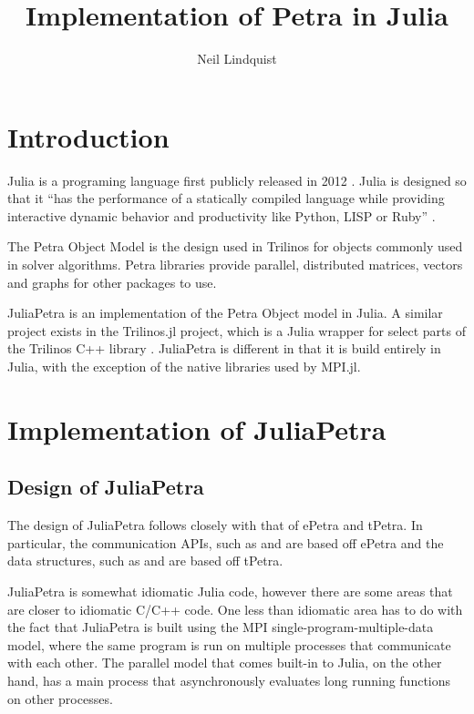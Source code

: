 \documentclass[acmsmall]{acmart}
\title{Implementation of Petra in Julia}
\author{Neil Lindquist}
\newcommand{\juliaSnippet}[1]{\texttt{\detokenize{#1}}}
\begin{document}
\maketitle

\section{Introduction}

Julia is a programing language first publicly released in 2012 \cite{WhyWeCreatedJulia}.
Julia is designed so that it
``has the performance of a statically compiled
language while providing interactive dynamic behavior and productivity like Python, LISP or
Ruby'' \cite{JuliaDesignPaper}.

The Petra Object Model is the design used in Trilinos for objects commonly used in solver algorithms.
\cite{OverviewOfTrilinos}
Petra libraries provide parallel, distributed matrices, vectors and graphs for other packages to use.

JuliaPetra is an implementation of the Petra Object model in Julia.
A similar project exists in the Trilinos.jl project, which is a Julia wrapper for select parts of
the Trilinos C++ library \cite{Trilinos.jlGithub}.
JuliaPetra is different in that it is build entirely in Julia, with the exception of the
native libraries used by MPI.jl.


\section{Implementation of JuliaPetra}

\subsection{Design of JuliaPetra}

The design of JuliaPetra follows closely with that of ePetra and tPetra.
In particular, the communication APIs, such as \juliaSnippet{Comm} and \juliaSnippet{BlockMap}
are based off ePetra and the data structures, such as \juliaSnippet{MultiVector} and
\juliaSnippet{RowMatrix} are based off tPetra.

JuliaPetra is somewhat idiomatic Julia code, however there are some areas that are closer to
idiomatic C/C++ code.
One less than idiomatic area has to do with the fact that JuliaPetra is built using the MPI
single-program-multiple-data model, where the same program is run on multiple processes
that communicate with each other.
The parallel model that comes built-in to Julia, on the other hand, has a main process that
asynchronously evaluates long running functions on other processes.  \cite{JuliaFreshApproach}
\end{document}
